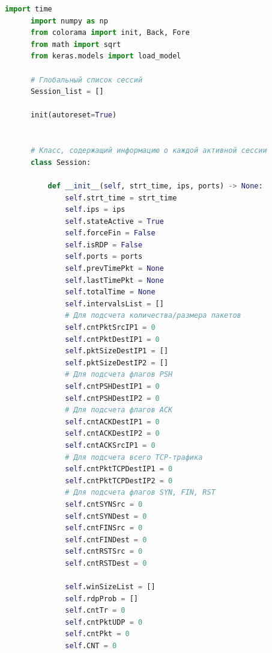 \documentclass[bachelor, och, coursework]{SCWorks}
\begin{document}
    \begin{lstlisting}[language=Python]
      import time
      import numpy as np
      from colorama import init, Back, Fore
      from math import sqrt
      from keras.models import load_model
      
      # Глобальный список сессий
      Session_list = []
      
      init(autoreset=True)
      
      
      # Класс, содержащий информацию о каждой активной сессии
      class Session:
      
          def __init__(self, strt_time, ips, ports) -> None:
              self.strt_time = strt_time
              self.ips = ips
              self.stateActive = True
              self.forceFin = False
              self.isRDP = False
              self.ports = ports
              self.prevTimePkt = None
              self.lastTimePkt = None
              self.totalTime = None
              self.intervalsList = []
              # Для подсчета количества/размера пакетов
              self.cntPktSrcIP1 = 0
              self.cntPktDestIP1 = 0
              self.pktSizeDestIP1 = []
              self.pktSizeDestIP2 = []
              # Для подсчета флагов PSH        
              self.cntPSHDestIP1 = 0
              self.cntPSHDestIP2 = 0
              # Для подсчета флагов ACK
              self.cntACKDestIP1 = 0
              self.cntACKDestIP2 = 0
              self.cntACKSrcIP1 = 0
              # Для подсчета всего TCP-трафика
              self.cntPktTCPDestIP1 = 0
              self.cntPktTCPDestIP2 = 0
              # Для подсчета флагов SYN, FIN, RST
              self.cntSYNSrc = 0
              self.cntSYNDest = 0
              self.cntFINSrc = 0
              self.cntFINDest = 0
              self.cntRSTSrc = 0
              self.cntRSTDest = 0
              
              self.winSizeList = []
              self.rdpProb = []
              self.cntTr = 0
              self.cntPktUDP = 0
              self.cntPkt = 0
              self.CNT = 0
      

\end{lstlisting}
\end{document}
